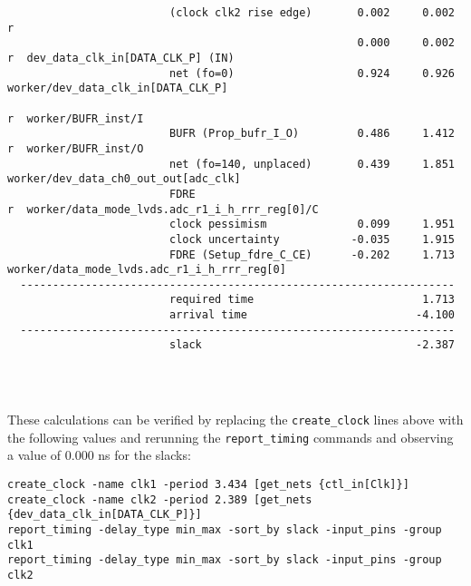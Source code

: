 \documentclass{article}
\begin{document}
\begin{lstlisting}
                         (clock clk2 rise edge)       0.002     0.002 r  
                                                      0.000     0.002 r  dev_data_clk_in[DATA_CLK_P] (IN)
                         net (fo=0)                   0.924     0.926    worker/dev_data_clk_in[DATA_CLK_P]
                                                                      r  worker/BUFR_inst/I
                         BUFR (Prop_bufr_I_O)         0.486     1.412 r  worker/BUFR_inst/O
                         net (fo=140, unplaced)       0.439     1.851    worker/dev_data_ch0_out_out[adc_clk]
                         FDRE                                         r  worker/data_mode_lvds.adc_r1_i_h_rrr_reg[0]/C
                         clock pessimism              0.099     1.951    
                         clock uncertainty           -0.035     1.915    
                         FDRE (Setup_fdre_C_CE)      -0.202     1.713    worker/data_mode_lvds.adc_r1_i_h_rrr_reg[0]
  -------------------------------------------------------------------
                         required time                          1.713    
                         arrival time                          -4.100    
  -------------------------------------------------------------------
                         slack                                 -2.387    




\end{lstlisting}
\fontsize{10}{12}\selectfont
These calculations can be verified by replacing the \texttt{create\_clock} lines above with the following values and rerunning the \texttt{report\_timing} commands and observing a value of 0.000 ns for the slacks:
\begin{lstlisting}
create_clock -name clk1 -period 3.434 [get_nets {ctl_in[Clk]}]
create_clock -name clk2 -period 2.389 [get_nets {dev_data_clk_in[DATA_CLK_P]}]
report_timing -delay_type min_max -sort_by slack -input_pins -group clk1
report_timing -delay_type min_max -sort_by slack -input_pins -group clk2
\end{lstlisting}
\fontsize{6}{12}\selectfont
\end{document}
